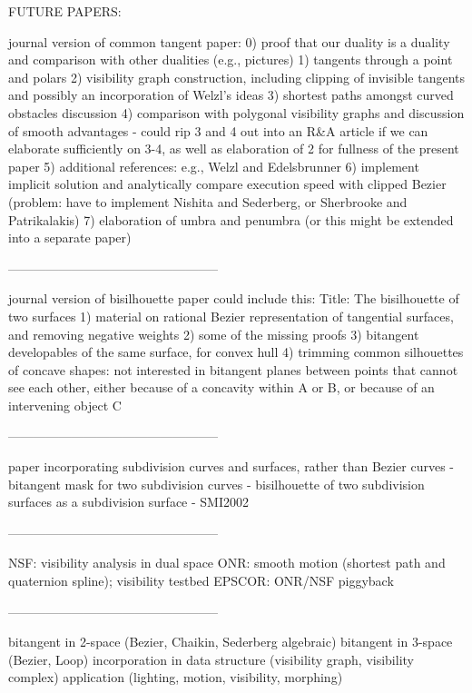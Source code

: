 FUTURE PAPERS:

journal version of common tangent paper:
0) proof that our duality is a duality 
	and comparison with other dualities (e.g., pictures)
1) tangents through a point and polars
2) visibility graph construction, including clipping of invisible tangents
	and possibly an incorporation of Welzl's ideas
3) shortest paths amongst curved obstacles discussion
4) comparison with polygonal visibility graphs and discussion of smooth advantages
	- could rip 3 and 4 out into an R&A article if we can elaborate
	  sufficiently on 3-4, as well as elaboration of 2 for fullness of the present paper
5) additional references: e.g., Welzl and Edelsbrunner
6) implement implicit solution and analytically compare execution speed
	with clipped Bezier (problem: have to implement Nishita and Sederberg,
	or Sherbrooke and Patrikalakis)
7) elaboration of umbra and penumbra (or this might be extended into a
	separate paper)

--------------------------------------------------

journal version of bisilhouette paper could include this:
Title: The bisilhouette of two surfaces
1) material on rational Bezier representation of tangential surfaces, 
	and removing negative weights
2) some of the missing proofs
3) bitangent developables of the same surface, for convex hull
4) trimming common silhouettes of concave shapes: not interested in
	bitangent planes between points that cannot see each other,
	either because of a concavity within A or B,
	or because of an intervening object C
	
--------------------------------------------------
	
paper incorporating subdivision curves and surfaces, rather than Bezier curves
 - bitangent mask for two subdivision curves
 - bisilhouette of two subdivision surfaces as a subdivision surface
 - SMI2002
 
--------------------------------------------------

NSF: visibility analysis in dual space
ONR: smooth motion (shortest path and quaternion spline); visibility testbed
EPSCOR: ONR/NSF piggyback
 
--------------------------------------------------

bitangent in 2-space (Bezier, Chaikin, Sederberg algebraic)
bitangent in 3-space (Bezier, Loop)
incorporation in data structure (visibility graph, visibility complex)
application (lighting, motion, visibility, morphing)

